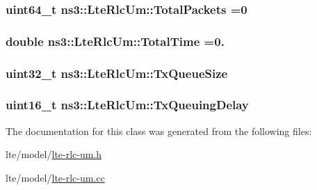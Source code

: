 \subsubsection[{\texorpdfstring{Total\+Packets}{TotalPackets}}]{\setlength{\rightskip}{0pt plus 5cm}uint64\+\_\+t ns3\+::\+Lte\+Rlc\+Um\+::\+Total\+Packets =0\hspace{0.3cm}{\ttfamily [private]}}\hypertarget{classns3_1_1LteRlcUm_aa73359807fbf8026a89c765b619e0e30}{}\label{classns3_1_1LteRlcUm_aa73359807fbf8026a89c765b619e0e30}
\subsubsection[{\texorpdfstring{Total\+Time}{TotalTime}}]{\setlength{\rightskip}{0pt plus 5cm}double ns3\+::\+Lte\+Rlc\+Um\+::\+Total\+Time =0.\hspace{0.3cm}{\ttfamily [private]}}\hypertarget{classns3_1_1LteRlcUm_a94d9298d5b49e9f301caacf6c849eacc}{}\label{classns3_1_1LteRlcUm_a94d9298d5b49e9f301caacf6c849eacc}
\subsubsection[{\texorpdfstring{Tx\+Queue\+Size}{TxQueueSize}}]{\setlength{\rightskip}{0pt plus 5cm}uint32\+\_\+t ns3\+::\+Lte\+Rlc\+Um\+::\+Tx\+Queue\+Size\hspace{0.3cm}{\ttfamily [private]}}\hypertarget{classns3_1_1LteRlcUm_a14a499b2042957fefdeb2ed75a090c5c}{}\label{classns3_1_1LteRlcUm_a14a499b2042957fefdeb2ed75a090c5c}
\subsubsection[{\texorpdfstring{Tx\+Queuing\+Delay}{TxQueuingDelay}}]{\setlength{\rightskip}{0pt plus 5cm}uint16\+\_\+t ns3\+::\+Lte\+Rlc\+Um\+::\+Tx\+Queuing\+Delay\hspace{0.3cm}{\ttfamily [private]}}\hypertarget{classns3_1_1LteRlcUm_aeeec4694ffd96880f4a05c5e200c97b4}{}\label{classns3_1_1LteRlcUm_aeeec4694ffd96880f4a05c5e200c97b4}


The documentation for this class was generated from the following files\+:\begin{DoxyCompactItemize}
\item 
lte/model/\hyperlink{lte-rlc-um_8h}{lte-\/rlc-\/um.\+h}\item 
lte/model/\hyperlink{lte-rlc-um_8cc}{lte-\/rlc-\/um.\+cc}\end{DoxyCompactItemize}
